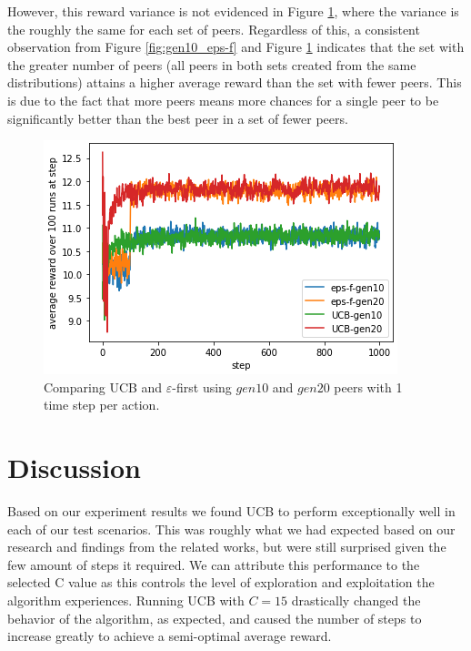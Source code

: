 \documentclass{article}
\begin{document}
However, this reward variance is not evidenced in Figure \ref{fig:gen10-20_UCB_eps-f}, where the variance is the roughly the same for each set of peers. Regardless of this, 
a consistent observation from Figure \ref{fig:gen10_eps-f} and Figure \ref{fig:gen10-20_UCB_eps-f} indicates that the set with the greater number of peers (all peers in 
both sets created from the same distributions) attains a higher average reward than the set with fewer peers. This is due to the fact that more peers means more chances for 
a single peer to be significantly better than the best peer in a set of fewer peers.
\begin{figure}[h]
    \centering
    \includegraphics[width=1\linewidth]{figs/gen10-20_UCB_eps-f.png}
    \caption{Comparing UCB and $\varepsilon$-first using $gen10$ and $gen20$ peers with 1 time step per action.}
    \label{fig:gen10-20_UCB_eps-f}
\end{figure}

\section{Discussion}

Based on our experiment results we found UCB to perform exceptionally well in each of our test scenarios. This was roughly what we had expected based on our research and 
findings from the related works, but were still surprised given the few amount of steps it required. We can attribute this performance to the selected C value as this 
controls the level of exploration and exploitation the algorithm experiences. Running UCB with $C=15$ drastically changed the behavior of the algorithm, as expected, and 
caused the number of steps to increase greatly to achieve a semi-optimal average reward.
\end{document}
